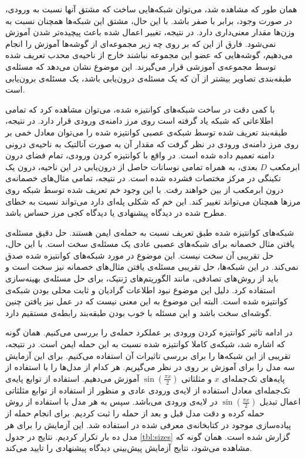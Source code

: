 \documentclass[12pt,onecolumn,a4paper]{article}
\begin{document}
همان طور که مشاهده شد، می‌توان شبکه‌هایی ساخت که مشتق آنها نسبت به ورودی، در صورت وجود، برابر با صفر باشد. با این حال، مشتق این شبکه‌ها همچنان نسبت به وزن‌ها مقدار معنی‌داری دارد. در نتیجه، تغییر اعمال شده باعث پیچیده‌تر شدن آموزش نمی‌شود. فارق از این که بر روی چه زیر مجموعه‌ای از گوشه‌ها آموزش را انجام می‌دهیم، گوشه‌هایی که عضو این مجموعه نباشند خارج از ناحیه‌ی محدب تعریف شده توسط مجموعه‌ی آموزشی قرار می‌گیرند. این موضوع نشان می‌دهد که مسئله‌ی طبقه‌بندی تصاویر بیشتر از آن که یک مسئله‌ی درون‌یابی باشد، یک مسئله‌ی برون‌یابی است.

با کمی دقت در ساخت شبکه‌های کوانتیزه شده، می‌توان مشاهده کرد که تمامی اطلاعاتی که شبکه یاد گرفته است روی مرز دامنه‌ی ورودی قرار دارد. در نتیجه، طبقه‌بند تعریف شده توسط شبکه‌ی عصبی کوانتیزه شده را می‌توان معادل خمی بر روی مرز دامنه‌ی ورودی در نظر گرفت که مقدار آن به صورت آنالتیک به ناحیه‌ی درونی دامنه تعمیم داده شده است. در واقع با کوانتیزه کردن ورودی، تمام فضای درون ابرمکعب $D$ بعدی، به همراه تمامی نوسانات حاصل از درون‌یابی در این ناحیه، درون یک تکینگی در مرکز مختصات فشرده شده است. در نتیجه، تمامی مثال‌های خصمانه‌ی درون ابرمکعب از بین خواهند رفت. با این وجود خم تعریف شده توسط شبکه روی مرزها همچنان می‌تواند تغییر کند. این خم که شکلی پله‌ای دارد می‌تواند نسبت به خطای مطرح شده در دیدگاه پیشنهادی یا دیدگاه کجی مرز حساس باشد.

شبکه‌های کوانتیزه شده طبق تعریف نسبت به حمله‌ی  ایمن هستند. حل دقیق مسئله‌ی یافتن مثال خصمانه برای شبکه‌های عصبی عادی یک مسئله‌ی سخت است\cite{szegedy2013intriguing}. با این حال، حل تقریبی آن سخت نیست. این موضوع در مورد شبکه‌های کوانتیزه شده صدق نمی‌کند. در این شبکه‌ها، حل تقریبی مسئله‌ی یافتن مثال‌های خصمانه نیز سخت است و باید از روش‌های تصادفی، مانند الگوریتم‌های ژنتیک، برای حل مسئله‌ی بهینه‌سازی استفاده کرد. دلیل این موضوع نبود اطلاعات گرادیان و ثابت محلی بودن  شبکه‌ی کوانتیزه شده است. البته این موضوع به این معنی نیست که در عمل نیز یافتن چنین گوشه‌ای سخت باشد و این مسئله با خوب بودن طبقه‌بند رابطه‌ی مستقیم دارد.

در ادامه تاثیر کوانتیزه کردن ورودی بر عملکرد حمله‌ی  را بررسی می‌کنیم. همان گونه که اشاره شد، شبکه‌ی کاملا کوانتیزه شده نسبت به این حمله ایمن است. در نتیجه، تقریبی از این شبکه‌ها را برای بررسی تاثیرات آن استفاده می‌کنیم. برای این آزمایش سه مدل را برای آموزش بر روی
در نظر می‌گیریم. هر کدام از مدل‌ها را با استفاده از پایه‌های تک‌جمله‌ای $x$ و مثلثاتی $\sin(\frac{\pi x}{2})$ آموزش می‌دهیم. استفاده از توابع پایه‌ی تک‌جمله‌ای معادل استفاده از لایه‌ی ورودی عادی و منظور از استفاده از توابع مثلثاتی اعمال تبدیل $\sin(\frac{\pi x}{2})$ در لایه‌ی ورودی می‌باشد. سپس به هر مدل با استفاده از روش
حمله کرده و  دقت مدل قبل و بعد از حمله را ثبت کردیم. برای انجام حمله از پیاده‌سازی موجود در کتابخانه‌ی معرفی شده در 
\cite{papernot2018cleverhans}
استفاده شد. این آزمایش را برای هر مدل ده بار تکرار کردیم. نتایج در جدول
\ref{tbl:sizes}
گزارش شده است. همان گونه که مشاهده می‌شود، نتایج آزمایش پیش‌بینی دیدگاه پیشنهادی را تایید می‌کند.
\end{document}
